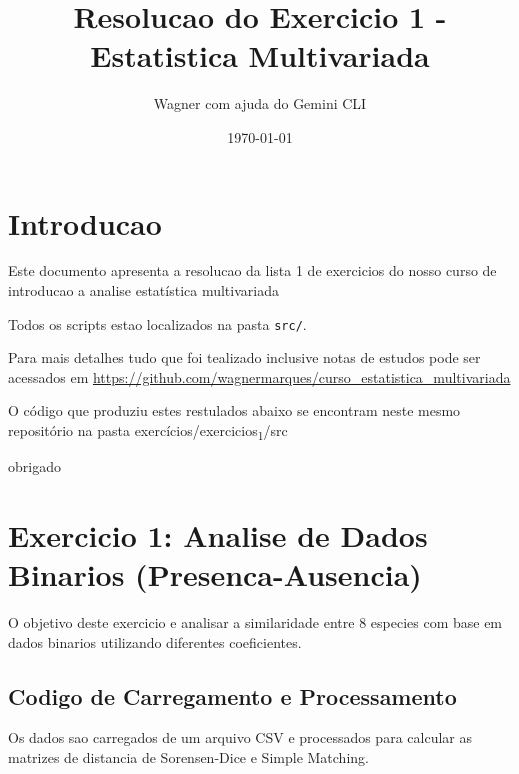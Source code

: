\documentclass[11pt]{article}
\author{Wagner com ajuda do Gemini CLI}
\date{\today}
\title{Resolucao do Exercicio 1 - Estatistica Multivariada}
\begin{document}
\maketitle
\setcounter{tocdepth}{2}
\tableofcontents

\section{Introducao}
\label{sec:orgf01a873}
Este documento apresenta a resolucao da lista 1 de exercicios do nosso
curso de introducao a analise estatística multivariada

Todos os scripts estao localizados na pasta \texttt{src/}.

Para mais detalhes tudo que foi tealizado inclusive notas de estudos
pode ser acessados em
\url{https://github.com/wagnermarques/curso\_estatistica\_multivariada}


O código que produziu estes restulados abaixo se encontram neste mesmo
repositório na pasta exercícios/exercicios\textsubscript{1}/src


obrigado
\section{Exercicio 1: Analise de Dados Binarios (Presenca-Ausencia)}
\label{sec:orge296569}
O objetivo deste exercicio e analisar a similaridade entre 8 especies com base em dados binarios utilizando diferentes coeficientes.
\subsection{Codigo de Carregamento e Processamento}
\label{sec:orgec608c0}
Os dados sao carregados de um arquivo CSV e processados para calcular as matrizes de distancia de Sorensen-Dice e Simple Matching.
\end{document}
